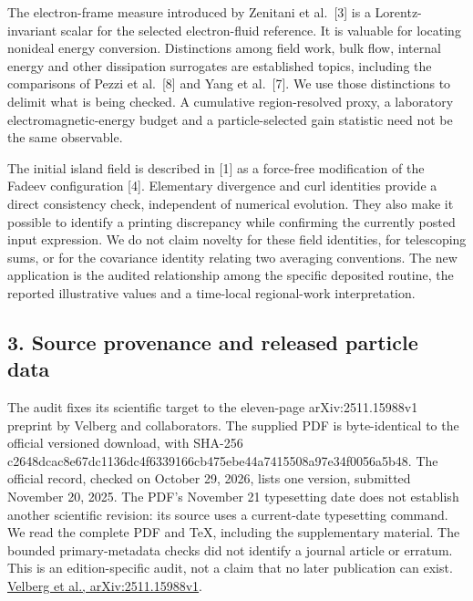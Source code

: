 The electron-frame measure introduced by Zenitani et al.~{[}3{]} is a
Lorentz-invariant scalar for the selected electron-fluid reference. It
is valuable for locating nonideal energy conversion. Distinctions among
field work, bulk flow, internal energy and other dissipation surrogates
are established topics, including the comparisons of Pezzi et
al.~{[}8{]} and Yang et al.~{[}7{]}. We use those distinctions to
delimit what is being checked. A cumulative region-resolved proxy, a
laboratory electromagnetic-energy budget and a particle-selected gain
statistic need not be the same observable.

The initial island field is described in {[}1{]} as a force-free
modification of the Fadeev configuration {[}4{]}. Elementary divergence
and curl identities provide a direct consistency check, independent of
numerical evolution. They also make it possible to identify a printing
discrepancy while confirming the currently posted input expression. We
do not claim novelty for these field identities, for telescoping sums,
or for the covariance identity relating two averaging conventions. The
new application is the audited relationship among the specific deposited
routine, the reported illustrative values and a time-local regional-work
interpretation.

\subsection{3. Source provenance and released particle
data}\label{source-provenance-and-released-particle-data}

The audit fixes its scientific target to the eleven-page
arXiv:2511.15988v1 preprint by Velberg and collaborators. The supplied
PDF is byte-identical to the official versioned download, with SHA-256
c2648dcac8e67dc1136dc4f6339166cb475ebe44a7415508a97e34f0056a5b48. The
official record, checked on October 29, 2026, lists one version,
submitted November 20, 2025. The PDF's November 21 typesetting date does
not establish another scientific revision: its source uses a
current-date typesetting command. We read the complete PDF and TeX,
including the supplementary material. The bounded primary-metadata
checks did not identify a journal article or erratum. This is an
edition-specific audit, not a claim that no later publication can exist.
\href{https://arxiv.org/abs/2511.15988v1}{Velberg et al.,
arXiv:2511.15988v1}.

